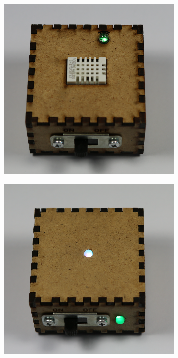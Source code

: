 \begin{figure}[ht]
    \centering
    \begin{subfigure}[b]{0.3\textwidth}
        \includegraphics[width=1\linewidth]{bilder/chapter1/DHT22.png}
        \caption{}
        \label{fig:gull}
    \end{subfigure}
    \quad
    \begin{subfigure}[b]{0.3\textwidth}
        \includegraphics[width=1\linewidth]{bilder/chapter1/LED.png}

\end{subfigure}
\end{figure}
